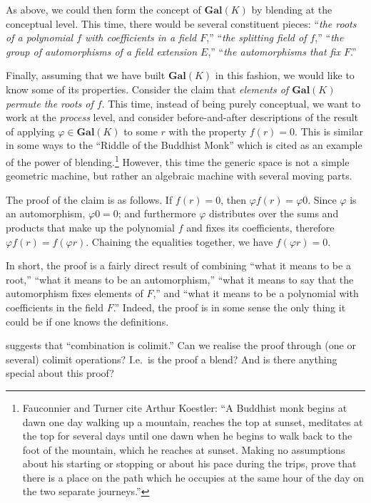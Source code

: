 As above, we could then form the concept of $\mathbf{Gal}(K)$ by blending
at the conceptual level.  This time, there would be several constituent pieces:
``\emph{the roots of a polynomial $f$ with coefficients in a field $F$},''
``\emph{the splitting field of $f$},''
``\emph{the group of automorphisms of a field extension $E$},''
``\emph{the automorphisms that fix $F$}.''

Finally, assuming that we have built $\mathbf{Gal}(K)$ in this
fashion, we would like to know some of its properties.  Consider the
claim that \emph{elements of $\mathbf{Gal}(K)$ permute the roots of
  $f$}.  This time, instead of being purely conceptual, we want to
work at the \emph{process} level, and consider before-and-after
descriptions of the result of applying $\varphi\in\mathbf{Gal}(K)$ to
some $r$ with the property $f(r)=0$.  This is similar in some ways to
the ``Riddle of the Buddhist Monk'' \cite{Fau98} which is cited as
an example of the power of blending.\footnote{Fauconnier and Turner
  cite Arthur Koestler: ``A Buddhist monk begins at dawn one day
  walking up a mountain, reaches the top at sunset, meditates at the
  top for several days until one dawn when he begins to walk back to
  the foot of the mountain, which he reaches at sunset.  Making no
  assumptions about his starting or stopping or about his pace during
  the trips, prove that there is a place on the path which he occupies
  at the same hour of the day on the two separate journeys.''}
However, this time the generic space is not a simple geometric machine,
but rather an algebraic machine with several moving parts.

The proof of the claim is as follows.  If $f(r)=0$, then $\varphi
f(r)=\varphi 0$.  Since $\varphi$ is an automorphism, $\varphi 0 = 0$;
and furthermore $\varphi$ distributes over the sums and products that
make up the polynomial $f$ and fixes its coefficients, therefore
$\varphi f(r)=f(\varphi r)$.  Chaining the equalities together, we
have $f(\varphi r)=0$.

In short, the proof is a fairly direct result of combining ``what it
means to be a root,'' ``what it means to be an automorphism,''
``what it means to say that the automorphism fixes elements of $F$,''
and
``what it means to be a polynomial with coefficients in the
field $F$.''
Indeed, the proof is in some sense the only thing it could be if one
knows the definitions.  

\textcite{Goguen92sheafsemantics} suggests that ``combination is
colimit.''  Can we realise the proof through (one or several) colimit
operations?  I.e.~is the proof a blend?  And is there anything special
about this proof?

